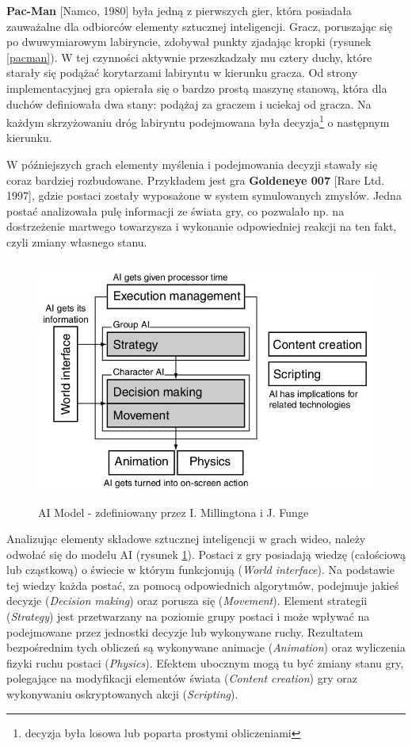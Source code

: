 \textbf{Pac-Man} [Namco, 1980] była jedną z pierwszych gier, która posiadała zauważalne dla odbiorców elementy sztucznej inteligencji. Gracz, poruszając się po dwuwymiarowym labiryncie, zdobywał punkty zjadając kropki (rysunek \ref{pacman}). W tej czynności aktywnie przeszkadzały mu cztery duchy, które starały się podążać korytarzami labiryntu w kierunku gracza. Od strony implementacyjnej gra opierała się o bardzo prostą maszynę stanową, która dla duchów definiowała dwa stany: podążaj za graczem i uciekaj od gracza. Na każdym skrzyżowaniu dróg labiryntu podejmowana była decyzja\footnote{decyzja była losowa lub poparta prostymi obliczeniami} o następnym kierunku.

W późniejszych grach elementy myślenia i podejmowania decyzji stawały się coraz bardziej rozbudowane. Przykładem jest gra \textbf{Goldeneye 007} [Rare Ltd. 1997], gdzie postaci zostały wyposażone w system symulowanych zmysłów. Jedna postać analizowała pulę informacji ze świata gry, co pozwalało np. na dostrzeżenie martwego towarzysza i wykonanie odpowiedniej reakcji na ten fakt, czyli zmiany własnego stanu.

\begin{figure}
\begin{center}
	\includegraphics[width=120mm,height=80mm]{images/aimodel}
	\caption{AI Model - zdefiniowany przez I. Millingtona i J. Funge\label{aimodel}}
\end{center}
\end{figure}

Analizując elementy składowe sztucznej inteligencji w grach wideo, należy odwołać się do modelu AI (rysunek \ref{aimodel}). Postaci z gry posiadają wiedzę (całościową lub cząstkową) o świecie w którym funkcjonują (\emph{World interface}). Na podstawie tej wiedzy każda postać, za pomocą odpowiednich algorytmów, podejmuje jakieś decyzje (\emph{Decision making}) oraz porusza się (\emph{Movement}). Element strategii (\emph{Strategy}) jest przetwarzany na poziomie grupy postaci i może wpływać na podejmowane przez jednostki decyzje lub wykonywane ruchy. Rezultatem bezpośrednim tych obliczeń są wykonywane animacje (\emph{Animation}) oraz wyliczenia fizyki ruchu postaci (\emph{Physics}). Efektem ubocznym mogą tu być zmiany stanu gry, polegające na modyfikacji elementów świata (\emph{Content creation}) gry oraz wykonywaniu oskryptowanych akcji (\emph{Scripting}).

